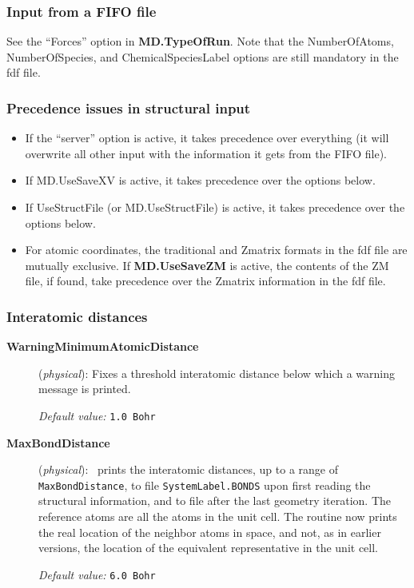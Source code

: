 \subsubsection{Input from a FIFO file}

See the ``Forces'' option in \textbf{MD.TypeOfRun}.
Note that the NumberOfAtoms, NumberOfSpecies, and ChemicalSpeciesLabel
options are still mandatory in the fdf file.

\subsubsection{Precedence issues in structural input}

\begin{itemize}
\item If the ``server'' option is active, it takes precedence over
everything (it will overwrite all other input with the information it
gets from the FIFO file).

\item If MD.UseSaveXV is active, it takes precedence over the options below.

\item If UseStructFile (or MD.UseStructFile) is active, it takes precedence
over the options below.

\item For atomic coordinates, the traditional and Zmatrix formats in
  the fdf file are mutually exclusive. If \textbf{MD.UseSaveZM} is
  active, the contents of the ZM file, if found, take precedence over
  the Zmatrix information in the fdf file.

\end{itemize}

\subsubsection{Interatomic distances}

\begin{description}
\item[\textbf{WarningMinimumAtomicDistance}] (\textit{physical}):
Fixes a threshold interatomic distance below which a warning
message is printed.

\textit{Default value:} \texttt{1.0 Bohr}

\item[\textbf{MaxBondDistance}] (\textit{physical}):
 \siesta\ prints the
interatomic distances, up to a range of
\texttt{MaxBondDistance}, to file \texttt{SystemLabel.BONDS} upon first
reading the structural information, and to file  after the last geometry iteration. The
reference atoms are all the atoms in the unit cell. The routine now
prints the real location of the neighbor atoms in space, and not, as in
earlier versions, the location of the equivalent representative in the
unit cell.

\textit{Default value:} \texttt{6.0 Bohr}

\end{description}


